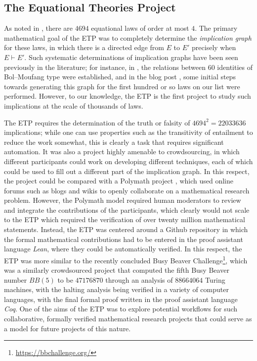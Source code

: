 \subsection{The Equational Theories Project}

As noted in , there are $4694$ equational laws of order at most $4$. The primary mathematical goal of the ETP was to completely determine the \emph{implication graph} for these laws, in which there is a directed edge from $E$ to $E'$ precisely when $E \vdash E'$. Such systematic determinations of implication graphs have been seen previously in the literature; for instance, in \cite{phillips-vojtechovsky}, the relations between $60$ identities of Bol--Moufang type were established, and in the blog post \cite[\S 17]{Wolfram_2022}, some initial steps towards generating this graph for the first hundred or so laws on our list were performed. However, to our knowledge, the ETP is the first project to study such implications at the scale of thousands of laws.

The ETP requires the determination of the truth or falsity of $4694^2 = 22033636$ implications; while one can use properties such as the transitivity of entailment to reduce the work somewhat, this is clearly a task that requires significant automation. It was also a project highly amenable to crowdsourcing, in which different participants could work on developing different techniques, each of which could be used to fill out a different part of the implication graph. In this respect, the project could be compared with a Polymath project \cite{Gowers2009}, which used online forums such as blogs and wikis to openly collaborate on a mathematical research problem. However, the Polymath model required human moderators to review and integrate the contributions of the participants, which clearly would not scale to the ETP which required the verification of over twenty million mathematical statements. Instead, the ETP was centered around a Github repository in which the formal mathematical contributions had to be entered in the proof assistant language \emph{Lean}, where they could be automatically verified. In this respect, the ETP was more similar to the recently concluded Busy Beaver Challenge\footnote{\url{https://bbchallenge.org/}}, which was a similarly crowdsourced project that computed the fifth Busy Beaver number $BB(5)$ to be $47176870$ through an analysis of $88664064$ Turing machines, with the halting analysis being verified in a variety of computer languages, with the final formal proof written in the proof assistant language \emph{Coq}. One of the aims of the ETP was to explore potential workflows for such collaborative, formally verified mathematical research projects that could serve as a model for future projects of this nature.


